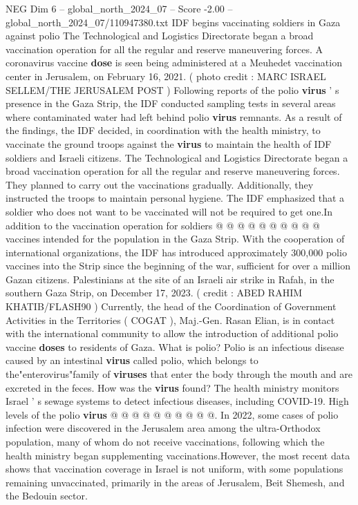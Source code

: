 \begin{textsample}{NEG Dim 6 – global\_north\_2024\_07 – Score -2.00 – global\_north\_2024\_07/110947380.txt}  \label{ex:f6_neg_136}
IDF begins vaccinating soldiers in Gaza against polio The Technological and Logistics Directorate began a broad vaccination operation for all the regular and reserve maneuvering forces.
A coronavirus vaccine \textbf{dose} is seen being administered at a Meuhedet vaccination center in Jerusalem, on February 16, 2021. ( photo credit : MARC ISRAEL SELLEM/THE JERUSALEM POST ) Following reports of the polio \textbf{virus} ' s presence in the Gaza Strip, the IDF conducted sampling tests in several areas where contaminated water had left behind polio \textbf{virus} remnants.
As a result of the findings, the IDF decided, in coordination with the health ministry, to vaccinate the ground troops against the \textbf{virus} to maintain the health of IDF soldiers and Israeli citizens.
The Technological and Logistics Directorate began a broad vaccination operation for all the regular and reserve maneuvering forces.
They planned to carry out the vaccinations gradually.
Additionally, they instructed the troops to maintain personal hygiene.
The IDF emphasized that a soldier who does not want to be vaccinated will not be required to get one.In addition to the vaccination operation for soldiers @ @ @ @ @ @ @ @ @ @ vaccines intended for the population in the Gaza Strip.
With the cooperation of international organizations, the IDF has introduced approximately 300,000 polio vaccines into the Strip since the beginning of the war, sufficient for over a million Gazan citizens.
Palestinians at the site of an Israeli air strike in Rafah, in the southern Gaza Strip, on December 17, 2023. ( credit : ABED RAHIM KHATIB/FLASH90 ) Currently, the head of the Coordination of Government Activities in the Territories ( COGAT ), Maj.-Gen.
Rasan Elian, is in contact with the international community to allow the introduction of additional polio vaccine \textbf{doses} to residents of Gaza.
What is polio?
Polio is an infectious disease caused by an intestinal \textbf{virus} called polio, which belongs to the"enterovirus"family of \textbf{viruses} that enter the body through the mouth and are excreted in the feces.
How was the \textbf{virus} found?
The health ministry monitors Israel ' s sewage systems to detect infectious diseases, including COVID-19.
High levels of the polio \textbf{virus} @ @ @ @ @ @ @ @ @ @.
In 2022, some cases of polio infection were discovered in the Jerusalem area among the ultra-Orthodox population, many of whom do not receive vaccinations, following which the health ministry began supplementing vaccinations.However, the most recent data shows that vaccination coverage in Israel is not uniform, with some populations remaining unvaccinated, primarily in the areas of Jerusalem, Beit Shemesh, and the Bedouin sector.

\end{textsample}
